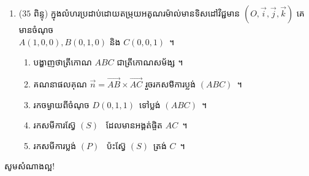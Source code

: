 \documentclass[12pt,a4paper]{article}
\def\hhard{\leavevmode\makebox[0pt][r]{\large\ensuremath{\star\star}\hspace{2em}}}
\begin{document}
\begin{enumerate}[I]
		\item\hhard ($ 35 $ ពិន្ទុ) ក្នុងលំហរប្រដាប់ដោយតម្រុយអតូណរម៉ាល់មានទិសដៅវិជ្ជមាន $ (O,\vec{i},\vec{j},\vec{k}) $ គេមានចំណុច​\\
			$ A(1,0,0),B(0,1,0) $ និង $ C(0,0,1) $~។
			\begin{enumerate}[a]
				\item បង្ហាញថាត្រីកោណ $ABC$ ជាត្រីកោណសម័ង្ស ។
				
				\item គណនាផលគុណ $ \overrightarrow{n}= \overrightarrow{AB}\times\overrightarrow{AC}$ រួចរកសមីការប្លង់ $(ABC)$~។
				\item រកចម្ងាយពីចំណុច $D(0, 1, 1)$~ទៅប្លង់ $(ABC)$~។
				\item រកសមីការស្វ៊ែ $(S)$~ ដែលមានអង្គត់ផ្ចិត $AC$~។
				\item រកសមីការប្លង់ $(P)$~ ប៉ះស្វ៊ែ $(S)$~ត្រង់ $C$~។ 
			\end{enumerate}
	\end{enumerate}
	\begin{center}
		\sffamily\color{black}
		សូមសំណាងល្អ!
	\end{center}\newpage
\end{document}
